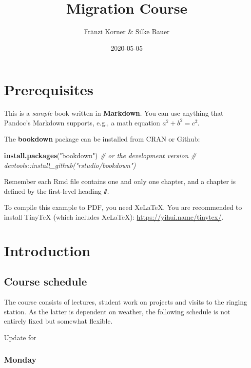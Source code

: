 \documentclass[
]{book}
\title{Migration Course}
\author{Fränzi Korner \& Silke Bauer}
\date{2020-05-05}
\newenvironment{Shaded}{\begin{snugshade}}{\end{snugshade}}
\newcommand{\CommentTok}[1]{\textcolor[rgb]{0.56,0.35,0.01}{\textit{#1}}}
\newcommand{\KeywordTok}[1]{\textcolor[rgb]{0.13,0.29,0.53}{\textbf{#1}}}
\newcommand{\NormalTok}[1]{#1}
\newcommand{\StringTok}[1]{\textcolor[rgb]{0.31,0.60,0.02}{#1}}
\begin{document}
\maketitle

{
\setcounter{tocdepth}{1}
\tableofcontents
}
\hypertarget{prerequisites}{%
\chapter{Prerequisites}\label{prerequisites}}

This is a \emph{sample} book written in \textbf{Markdown}. You can use anything that Pandoc's Markdown supports, e.g., a math equation \(a^2 + b^2 = c^2\).

The \textbf{bookdown} package can be installed from CRAN or Github:

\begin{Shaded}
\begin{Highlighting}[]
\KeywordTok{install.packages}\NormalTok{(}\StringTok{"bookdown"}\NormalTok{)}
\CommentTok{# or the development version}
\CommentTok{# devtools::install_github("rstudio/bookdown")}
\end{Highlighting}
\end{Shaded}

Remember each Rmd file contains one and only one chapter, and a chapter is defined by the first-level heading \texttt{\#}.

To compile this example to PDF, you need XeLaTeX. You are recommended to install TinyTeX (which includes XeLaTeX): \url{https://yihui.name/tinytex/}.

\hypertarget{introduction}{%
\chapter{Introduction}\label{introduction}}

\hypertarget{course-schedule}{%
\section{Course schedule}\label{course-schedule}}

The course consists of lectures, student work on projects and visits to the ringing station. As the latter is dependent on weather, the following schedule is not entirely fixed but somewhat flexible.

Update for

\hypertarget{monday}{%
\subsection{Monday}\label{monday}}
\end{document}
